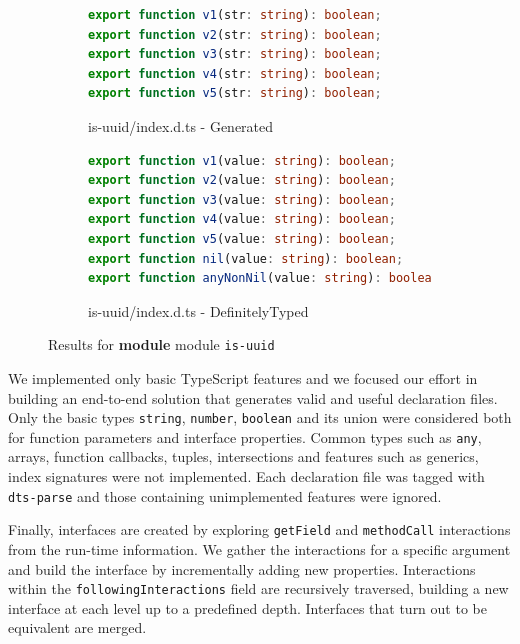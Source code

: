 \documentclass[english,cleveref,autoref,submission]{programming}
\newcommand{\figref}[1]{Figure~\ref{#1}}
\begin{document}


\begin{figure}[tp]
  \centering
  \begin{subfigure}{0.48\linewidth}
    \begin{lstlisting}[language=TypeScript,numbers=none]
export function v1(str: string): boolean;
export function v2(str: string): boolean;
export function v3(str: string): boolean;
export function v4(str: string): boolean;
export function v5(str: string): boolean;
    \end{lstlisting}
    \caption{is-uuid/index.d.ts - Generated}
  \end{subfigure}
  \hfill
  \begin{subfigure}{0.48\linewidth}
    \begin{lstlisting}[language=TypeScript,numbers=none]
export function v1(value: string): boolean;
export function v2(value: string): boolean;
export function v3(value: string): boolean;
export function v4(value: string): boolean;
export function v5(value: string): boolean;
export function nil(value: string): boolean;
export function anyNonNil(value: string): boolean;
    \end{lstlisting}
    \caption{is-uuid/index.d.ts - DefinitelyTyped}
  \end{subfigure}

  \caption{Results for \textbf{module}  module \texttt{is-uuid}}
  \label{fig:experiments-results-module-is-uuid}
\end{figure}

We implemented only basic TypeScript features and we focused our effort in building an
end-to-end solution that generates valid and useful declaration files. Only the basic
types \texttt{string}, \texttt{number}, \texttt{boolean} and its union were considered
both for function parameters and interface properties. Common types such as
\texttt{any}, arrays, function callbacks, tuples, intersections and features such as
generics, index signatures were not implemented. Each declaration file was tagged with
\texttt{dts-parse} and those containing unimplemented features were ignored.

Finally, interfaces are created by exploring \texttt{getField} and
\texttt{methodCall} interactions from the run-time information. We
gather the interactions for a specific argument and build the
interface by incrementally adding new properties. Interactions within
the \texttt{followingInteractions} field are recursively traversed,
building a new interface at each level up to a predefined depth. Interfaces that turn out
to be equivalent are merged.
\end{document}
